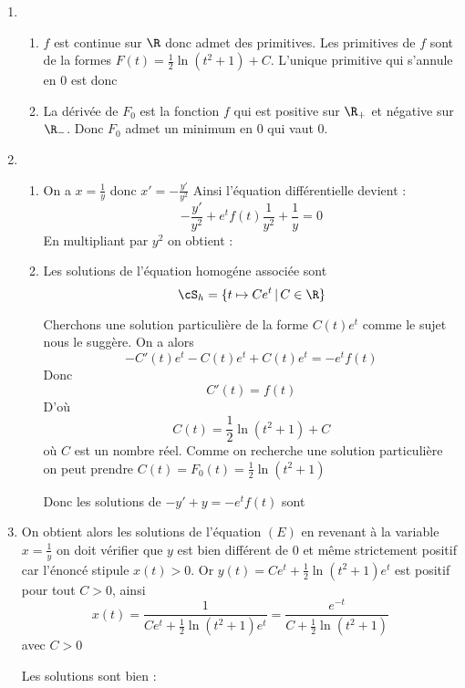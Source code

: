 \documentclass[a4paper, 11pt,reqno]{article}
\begin{document}
\begin{correction}
\begin{enumerate}
\item
\begin{enumerate}
\item $f$ est continue sur $\R$ donc admet des primitives. Les primitives de $f$ sont de la formes $F(t) = \frac{1}{2}\ln(t^2+1) + C$. L'unique primitive qui s'annule en $0$ est donc 
\item La dérivée de $F_0$ est la fonction $f$ qui est positive sur $\R_+$ et  négative sur $\R_-$. Donc $F_0$ admet un minimum en $0$ qui vaut $0$. 
\end{enumerate} 
\item \begin{enumerate}
\item On a $x=\frac{1}{y}$ donc $x'=-\frac{y'}{y^2}$ Ainsi l'équation différentielle devient : 
$$-\frac{y'}{y^2} +e^{t}f(t) \frac{1}{y^2}+\frac{1}{y}=0$$
En multipliant par $y^2$ on obtient :
\item Les solutions de l'équation homogéne associée sont 
$$\cS_h =\{ t\mapsto Ce^t\, |\, C\in \R\}$$

Cherchons une solution particulière de la forme $C(t)e^{t}$ comme le sujet nous le suggère. 
On a alors $$-C'(t)e^t -C(t)e^t +C(t)e^t =-e^{t}f(t)$$
Donc 
$$C'(t) = f(t)$$
D'où $$C(t)=\frac{1}{2}\ln(t^2+1) +C$$
où $C$ est un nombre réel. Comme on recherche une solution particulière on peut prendre $C(t) =F_0 (t) = \frac{1}{2}\ln(t^2+1) $

Donc les solutions de $-y' +y =-e^{t}f(t)$ sont 




\end{enumerate}
\item On obtient alors les solutions de l'équation $(E)$
en revenant à la variable $x=\frac{1}{y}$ on doit vérifier que $y$ est bien différent de $0$ et même strictement positif car l'énoncé stipule $x(t)>0$. Or $y(t) =  Ce^t +\frac{1}{2}\ln(t^2+1) e^t$ est positif pour tout $C>0$, ainsi 
$$x(t)=\frac{1}{ Ce^t +\frac{1}{2}\ln(t^2+1) e^t}= \frac{e^{-t}}{ C +\frac{1}{2}\ln(t^2+1) }$$
avec $C>0$ 


Les solutions sont bien : 


\end{enumerate}
\end{correction}
\end{document}
